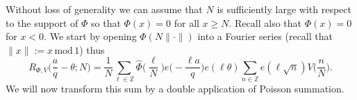 \documentclass[12pt,reqno]{amsart}
\theoremstyle{plain}
\newtheorem{lemma}{Lemma}
\numberwithin{equation}{section}
\numberwithin{figure}{section}
\theoremstyle{plain}
\theoremstyle{definition}
\theoremstyle{remark}
\newcommand{\mmod}{\,\mathrm{mod}\,}
\begin{document}
    Without loss of generality we can assume that $N$ is sufficiently large with respect to the support of $\Phi$ so that $\Phi(x) = 0$ for all $x \geq N$. Recall also that $\Phi(x)  = 0$ for $x < 0$. We start by opening $\Phi(N \| \cdot \|)$ into a Fourier series (recall that $\| x \| := x \mmod{1}$) thus
    $$
    R_{\Phi, V} \Big (\frac{a}{q} - \theta; N \Big ) 
    = \frac{1}{N} \sum_{\ell \in \mathbb{Z}} 
    \widehat{\Phi} \Big ( \frac{\ell}{N} \Big ) 
    e \Big ( - \frac{\ell a}{q} \Big ) 
    e(\ell \theta)
    \sum_{n \in \mathbb{Z}} e(\ell \sqrt{n}) 
    V \Big ( \frac{n}{N} \Big ).
    $$
    We will now transform this sum by a double application of
    Poisson summation.
\end{document}
